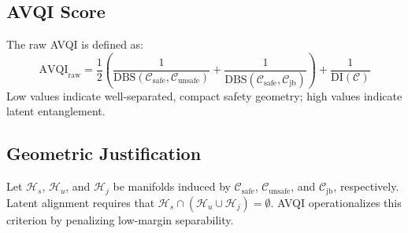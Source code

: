 

\subsection*{AVQI Score}
The raw AVQI is defined as:
\[
\mathrm{AVQI}_{\text{raw}} = \frac{1}{2} \left( \frac{1}{\mathrm{DBS}(\mathcal{C}_{\text{safe}}, \mathcal{C}_{\text{unsafe}})} + \frac{1}{\mathrm{DBS}(\mathcal{C}_{\text{safe}}, \mathcal{C}_{\text{jb}})} \right) + \frac{1}{\mathrm{DI}(\mathcal{C})}
\]
Low values indicate well-separated, compact safety geometry; high values indicate latent entanglement.

\subsection*{Geometric Justification}
Let $\mathcal{H}_s$, $\mathcal{H}_u$, and $\mathcal{H}_j$ be manifolds induced by $\mathcal{C}_{\text{safe}}$, $\mathcal{C}_{\text{unsafe}}$, and $\mathcal{C}_{\text{jb}}$, respectively. Latent alignment requires that $\mathcal{H}_s \cap (\mathcal{H}_u \cup \mathcal{H}_j) = \emptyset$. AVQI operationalizes this criterion by penalizing low-margin separability.

